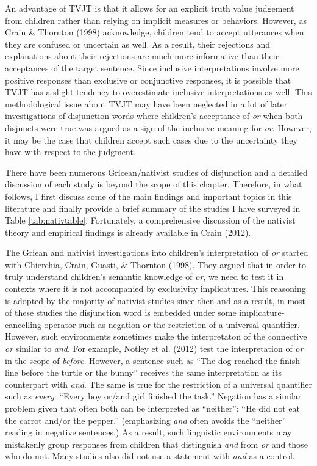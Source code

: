 \documentclass[oneside]{report}
\theoremstyle{definition}
\theoremstyle{definition}
\theoremstyle{definition}
\theoremstyle{remark}
\begin{document}
An advantage of TVJT is that it allows for an explicit truth value
judgement from children rather than relying on implicit measures or
behaviors. However, as Crain \& Thornton (1998) acknowledge, children
tend to accept utterances when they are confused or uncertain as well.
As a result, their rejections and explanations about their rejections
are much more informative than their acceptances of the target sentence.
Since inclusive interpretations involve more positive responses than
exclusive or conjunctive responses, it is possible that TVJT has a
slight tendency to overestimate inclusive interpretations as well. This
methodological issue about TVJT may have been neglected in a lot of
later investigations of disjunction words where children's acceptance of
\emph{or} when both disjuncts were true was argued as a sign of the
inclusive meaning for \emph{or}. However, it may be the case that
children accept such cases due to the uncertainty they have with respect
to the judgment.

There have been numerous Gricean/nativist studies of disjunction and a
detailed discussion of each study is beyond the scope of this chapter.
Therefore, in what follows, I first discuss some of the main findings
and important topics in this literature and finally provide a brief
summary of the studies I have surveyed in Table \ref{tab:nativtable}.
Fortunately, a comprehensive discussion of the nativist theory and
empirical findings is already available in Crain (2012).

The Griean and nativist investigations into children's interpretation of
\emph{or} started with Chierchia, Crain, Guasti, \& Thornton (1998).
They argued that in order to truly understand children's semantic
knowledge of \emph{or}, we need to test it in contexts where it is not
accompanied by exclusivity implicatures. This reasoning is adopted by
the majority of nativist studies since then and as a result, in most of
these studies the disjunction word is embedded under some
implicature-cancelling operator such as negation or the restriction of a
universal quantifier. However, such environments sometimes make the
interpretaton of the connective \emph{or} similar to \emph{and}. For
example, Notley et al. (2012) test the interpretation of \emph{or} in
the scope of \emph{before}. However, a sentence such as ``The dog
reached the finish line before the turtle or the bunny'' receives the
same interpretation as its counterpart with \emph{and}. The same is true
for the restriction of a universal quantifier such as \emph{every}:
``Every boy or/and girl finished the task.'' Negation has a similar
problem given that often both can be interpreted as ``neither'': ``He
did not eat the carrot and/or the pepper.'' (emphasizing \emph{and}
often avoids the ``neither'' reading in negative sentences.) As a
result, such linguistic environments may mistakenly group responses from
children that distinguish \emph{and} from \emph{or} and those who do
not. Many studies also did not use a statement with \emph{and} as a
control.
\end{document}
